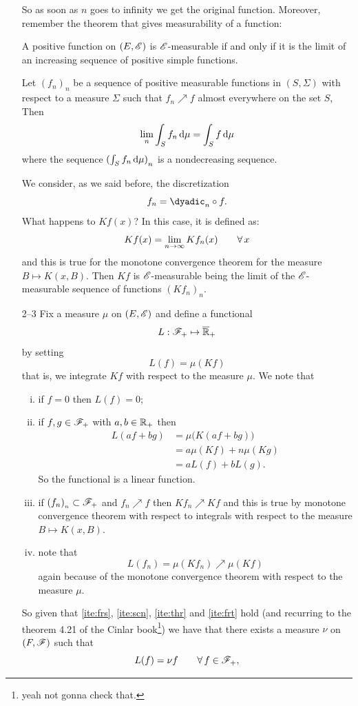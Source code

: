 \documentclass{report}
\begin{document}
\begin{fancyproof}
\begin{enumerate}
\begin{lemma}
		\end{lemma}
		So as soon as $n$ goes to infinity we get the original function. Moreover, remember the theorem that gives measurability of a function:
		\begin{revise}
			\begin{theorem}
				A positive function on $(E,\mathscr{E})$ is $\mathscr{E}$-measurable if and only if it is the limit of an increasing sequence of positive simple functions.
			\end{theorem}
			\begin{theorem}
				Let ${(f_n)}_{n}$ be a sequence of positive measurable functions in $(S,\Sigma)$ with respect to a measure $\Sigma$ such that $f_n\nearrow f$ almost everywhere on the set $S$, Then 
				\[\lim_{n}\int_S f_n\mathop{}\!\mathrm{d}\mu=\int_{S}^{}f\mathop{}\!\mathrm{d}\mu\]
				where the sequence ${(\int_S f_n \mathop{}\!\mathrm{d}\mu)}_{n}$ is a nondecreasing sequence.
			\end{theorem}
		\end{revise}
		We consider, as we said before, the discretization
		\[f_n=\dyadic_n\circ f.\]
		What happens to $K f(x)$? In this case, it is defined as:
		\[Kf(x)=\lim_{n\to\infty}K f_n(x)\qquad\forall\, x\]
		and this is true for the monotone convergence theorem for the measure $B\mapsto K(x,B)$. Then $Kf$ is $\mathscr{E}$-measurable being the limit of the $\mathscr{E}$-measurable sequence of functions $(Kf_n)_n$.
		\item[2--3] Fix a measure $\mu$ on $(E,\mathscr{E})$ and define a functional 
		\[L:\mathscr{F}_+\mapsto\overline{\mathbb{R}}_+\]
		by setting 
		\[L(f)=\mu(Kf)\]
		that is, we integrate $Kf$ with respect to the measure $\mu$. We note that
		\begin{enumerate}[i.)]
			\item\label{ite:frs} if $f=0$ then $L(f)=0$;
			\item\label{ite:scn} if $f,g\in\mathscr{F}_+$ with $a,b\in\mathbb{R}_+$ then 
			\begin{align*}
				L(af+bg)&=\mu\big(K(af+bg)\big)\\
				&=a\mu(Kf)+n\mu(Kg)\\
				&=aL(f)+bL(g).
			\end{align*}
			So the functional is a linear function.
			\item\label{ite:thr} if $(f_n)_{_{n}}\subset\mathscr{F}_+$ and $f_{n}\nearrow f$ then  $Kf_n\nearrow Kf$ and this is true by monotone convergence theorem with respect to integrals with respect to the measure $B\mapsto K(x, B)$. 
			\item\label{ite:frt} note that 
			\[L(f_n)=\mu(Kf_n)\nearrow\mu(Kf)\]
			again because of the monotone convergence theorem with respect to the measure $\mu$.
		\end{enumerate}
		So given that \ref{ite:frs}, \ref{ite:scn}, \ref{ite:thr} and \ref{ite:frt} hold (and recurring to the theorem 4.21 of the Cinlar book\footnote{yeah not gonna check that.}) we have that there exists a measure $\nu$ on $(F,\mathscr{F})$ such that
		\[L(f)=\nu f\qquad \forall\, f\in\mathscr{F}_+,\]
	

\end{enumerate}
\end{fancyproof}
\end{document}
